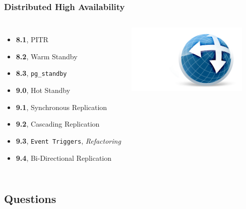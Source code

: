 \documentclass[english]{beamer}
\begin{document}
\begin{frame}[fragile]
  \frametitle{Distributed High Availability}

  \linebreak

\begin{columns}[c]

  \begin{itemize}
   \item<1-> \textbf{8.1}, PITR
   \item<2-> \textbf{8.2}, Warm Standby
   \item<3-> \textbf{8.3}, \texttt{pg\_standby}
   \item<4-> \textbf{9.0}, Hot Standby
   \item<5-> \textbf{9.1}, Synchronous Replication
   \item<6-> \textbf{9.2}, Cascading Replication
   \item<7-> \textbf{9.3}, \texttt{Event Triggers}, \textit{Refactoring}
   \item<7-> \textbf{9.4}, \alert{Bi-Directional Replication}
  \end{itemize}  

\includegraphics[height=9em]{bdr.png}
\end{columns}
\end{frame}

\subsection{Questions}

\end{document}
